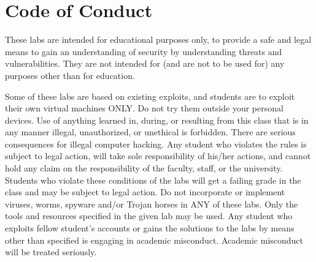 \documentclass[11pt]{article}
\begin{document}
\section{Code of Conduct}

These labs are intended for educational purposes only, to provide a safe and legal means to gain an understanding of security by understanding threats and vulnerabilities. They are not intended for (and are not to be used for) any purposes other than for education. 

Some of these labs are based on existing exploits, and students are to exploit their own virtual machines ONLY. Do not try them outside your personal devices. Use of anything learned in, during, or resulting from this class that is in any manner illegal, unauthorized, or unethical is forbidden. There are serious consequences for illegal computer hacking. Any student who violates the rules is subject to legal action, will take sole responsibility of his/her actions, and cannot hold any claim on the responsibility of the faculty, staff, or the university. Students who violate these conditions of the labs will get a failing grade in the class and may be subject to legal action. 
Do not incorporate or implement viruses, worms, spyware and/or Trojan horses in ANY of these labs. Only the tools and resources specified in the given lab may be used. Any student who exploits fellow student's accounts or gains the solutions to the labs by means other than specified is engaging in academic misconduct. Academic misconduct will be treated seriously. 
\end{document}
